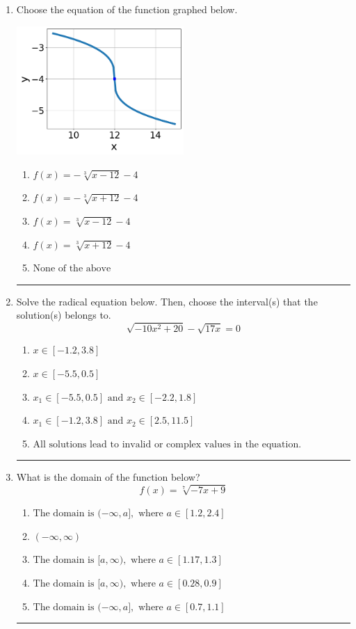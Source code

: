 \documentclass[14pt]{extbook}
\newcommand{\litem}[1]{\item#1\hspace*{-1cm}\rule{\textwidth}{0.4pt}}
\begin{document}
\begin{enumerate}
\litem{
Choose the equation of the function graphed below.
\begin{center}
    \includegraphics[width=0.5\textwidth]{../Figures/radicalGraphToEquationB.png}
\end{center}
\begin{enumerate}[label=\Alph*.]
\item \( f(x) = - \sqrt[3]{x - 12} - 4 \)
\item \( f(x) = - \sqrt[3]{x + 12} - 4 \)
\item \( f(x) = \sqrt[3]{x - 12} - 4 \)
\item \( f(x) = \sqrt[3]{x + 12} - 4 \)
\item \( \text{None of the above} \)

\end{enumerate} }
\litem{
Solve the radical equation below. Then, choose the interval(s) that the solution(s) belongs to.\[ \sqrt{-10 x^2 + 20} - \sqrt{17 x} = 0 \]\begin{enumerate}[label=\Alph*.]
\item \( x \in [-1.2,3.8] \)
\item \( x \in [-5.5,0.5] \)
\item \( x_1 \in [-5.5, 0.5] \text{ and } x_2 \in [-2.2,1.8] \)
\item \( x_1 \in [-1.2, 3.8] \text{ and } x_2 \in [2.5,11.5] \)
\item \( \text{All solutions lead to invalid or complex values in the equation.} \)

\end{enumerate} }
\litem{
What is the domain of the function below?\[ f(x) = \sqrt[7]{-7 x + 9} \]\begin{enumerate}[label=\Alph*.]
\item \( \text{The domain is } (-\infty, a], \text{   where } a \in [1.2, 2.4] \)
\item \( (-\infty, \infty) \)
\item \( \text{The domain is } [a, \infty), \text{   where } a \in [1.17, 1.3] \)
\item \( \text{The domain is } [a, \infty), \text{   where } a \in [0.28, 0.9] \)
\item \( \text{The domain is } (-\infty, a], \text{   where } a \in [0.7, 1.1] \)


\end{enumerate}}
\end{enumerate}
\end{document}
